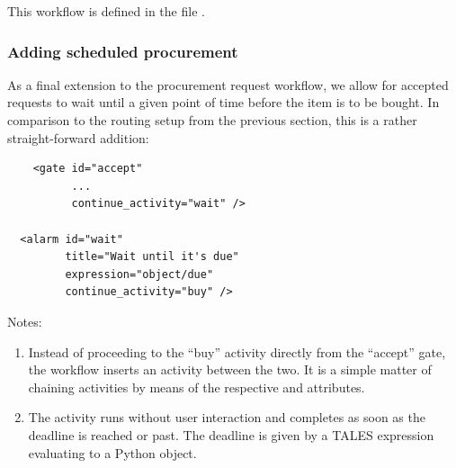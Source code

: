 This workflow is defined in the file
.

\subsubsection{Adding scheduled procurement}

As a final extension to the procurement request workflow, we allow for
accepted requests to wait until a given point of time before the item is to be
bought. In comparison to the routing setup from the previous section, this is
a rather straight-forward addition:

\begin{verbatim}
    <gate id="accept"
          ...
          continue_activity="wait" />

  <alarm id="wait"
         title="Wait until it's due"
         expression="object/due"
         continue_activity="buy" />
\end{verbatim}

Notes:
\begin{enumerate}
\item Instead of proceeding to the ``buy'' activity directly from the
  ``accept'' gate, the workflow inserts an  activity between the
  two. It is a simple matter of chaining activities by means of the respective
   and  attributes.
\item The  activity runs without user interaction and completes
  as soon as the deadline is reached or past. The deadline is given by a TALES
  expression evaluating to a Python  object.
\end{enumerate}
